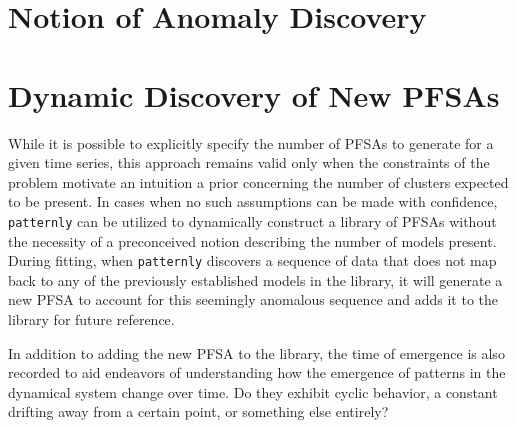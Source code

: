 \documentclass[9pt,journal]{IEEEtran}
\begin{document}
{\section{Notion of Anomaly Discovery}

\section{Dynamic Discovery of New PFSAs}
While it is possible to explicitly specify the number of PFSAs to generate for a given time series, this approach remains valid only when the constraints of the problem motivate an intuition a prior concerning the number of clusters expected to be present. In cases when no such assumptions can be made with confidence, \texttt{patternly} can be utilized to dynamically construct a library of PFSAs without the necessity of a preconceived notion describing the number of models present. During fitting, when \texttt{patternly} discovers a sequence of data that does not map back to any of the previously established models in the library, it will generate a new PFSA to account for this seemingly anomalous sequence and adds it to the library for future reference. 

In addition to adding the new PFSA to the library, the time of emergence is also recorded to aid endeavors of understanding how the emergence of patterns in the dynamical system change over time. Do they exhibit cyclic behavior, a constant drifting away from a certain point, or something else entirely?
   

}



              



\end{document}
